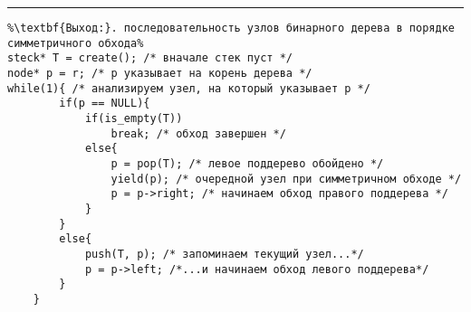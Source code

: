 \vspace{5pt} \hrule
\begin{lstlisting}[caption={Алгоритм симметричного обхода бинарного дерева}, label=p_313, escapechar=\%]
%\noindent\textbf{Вход:} бинарное дерево, представленное списочной структурой, r - указатель на корень.\\%
%\textbf{Выход:}. последовательность узлов бинарного дерева в порядке симметричного обхода%
steck* T = create(); /* вначале стек пуст */
node* p = r; /* p указывает на корень дерева */
while(1){ /* анализируем узел, на который указывает p */
		if(p == NULL){
			if(is_empty(T))
				break; /* обход завершен */
			else{
				p = pop(T); /* левое поддерево обойдено */
				yield(p); /* очередной узел при симметричном обходе */
				p = p->right; /* начинаем обход правого поддерева */
			}
		}
		else{
			push(T, p); /* запоминаем текущий узел...*/
			p = p->left; /*...и начинаем обход левого поддерева*/
		}
	}
\end{lstlisting}
